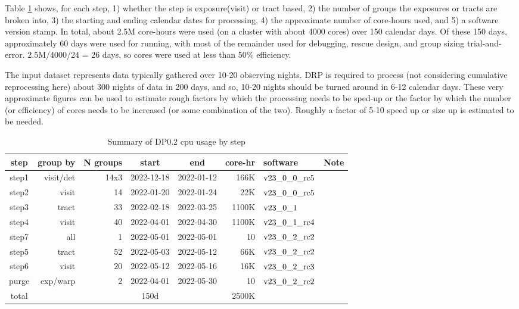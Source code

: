\documentclass[OPS,authoryear,toc]{lsstdoc}
\begin{document}
Table \ref{tab:summarycpu} shows, for each step, 1) whether the step is
exposure(visit) or tract based, 2) the number of groups the exposures or
tracts are broken into, 3) the starting and ending calendar dates 
for processing, 4) the approximate number of core-hours used, and 
5) a software version stamp. 
In total, about 2.5M core-hours were used (on a cluster with about
4000 cores) over 150 calendar days.  Of these 150 days, approximately
60 days were used for running, with most of the remainder used for
debugging, rescue design, and group sizing trial-and-error.  
2.5M/4000/24 = 26 days, so cores were used at less than 50\% efficiency.

The input dataset represents data typically gathered over 10-20
observing nights.  DRP is required to process (not considering cumulative
reprocessing here) about 300 nights of data in 200 days, 
and so, 10-20 nights should be turned around in 6-12
calendar days.  These very approximate figures can be used to estimate rough
factors by which the processing needs to be sped-up or the factor by
which the number (or efficiency) of cores needs to be increased 
(or some combination of the two).  Roughly a factor of 5-10 speed 
up or size up is estimated to be needed.


\begin{center}
\begin{table}[ht]
\caption{Summary of DP0.2 cpu usage by step}
\begin{tabular} { |c|r|r|c|c|r|l|l|}
\hline
step & group by & N groups & start & end & core-hr & software & Note\\
\hline
step1 & visit/det & 14x3 &2022-12-18& 2022-01-12 & 166K & $\rm v23\_0\_0\_rc5$ &\\
step2 & visit  & 14 & 2022-01-20& 2022-01-24 & 22K & $\rm v23\_0\_0\_rc5$ &\\
step3 & tract & 33 & 2022-02-18& 2022-03-25 & 1100K & $\rm v23\_0\_1$ &\\
step4 & visit & 40& 2022-04-01& 2022-04-30 & 1100K & $\rm v23\_0\_1\_rc4$ &\\
step7 & all & 1 & 2022-05-01& 2022-05-01 & 10 & $\rm v23\_0\_2\_rc2$ &\\
step5 & tract & 52 & 2022-05-03& 2022-05-12 & 66K & $\rm v23\_0\_2\_rc2$ &\\
step6 & visit & 20&2022-05-12& 2022-05-16 & 16K & $\rm v23\_0\_2\_rc3$ &\\
purge & exp/warp & 2 & 2022-04-01& 2022-05-30 & 10 & $\rm v23\_0\_2\_rc2$ & \\
\hline
total & & & 150d & & 2500K &&\\
\hline
\end{tabular}
\label{tab:summarycpu}
\end{table}
\end{center}
\end{document}
